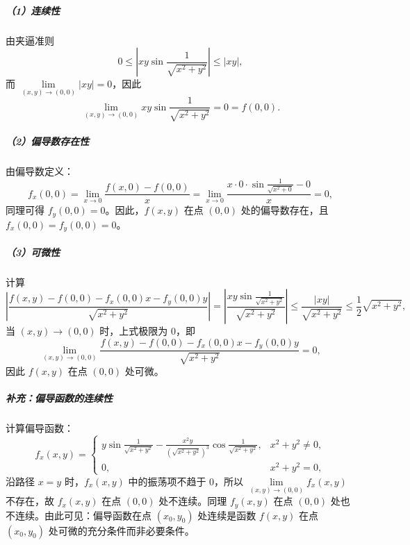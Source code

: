 \begin{solution}
    \subparagraph{（1）连续性}
由夹逼准则
\[
0 \le \left| xy\sin\frac{1}{\sqrt{x^2+y^2}} \right| \le |xy|,
\]
而 $\lim\limits_{(x,y)\to(0,0)} |xy| = 0$，因此
\[
\lim_{(x,y)\to(0,0)} xy\sin\frac{1}{\sqrt{x^2+y^2}} = 0=f(0,0).
\]

\subparagraph{（2）偏导数存在性}
由偏导数定义：
\[
f_x(0,0) = \lim_{x\to 0} \frac{f(x,0)-f(0,0)}{x}
= \lim_{x\to 0} \frac{x \cdot 0 \cdot \sin\frac{1}{\sqrt{x^2+0}} - 0}{x} = 0,
\]
同理可得 \( f_y(0,0) = 0 \)。因此，\( f(x,y) \) 在点 \( (0,0) \) 处的偏导数存在，且 \( f_x(0,0)=f_y(0,0)=0 \)。

\subparagraph{（3）可微性}
计算
\[
\left| \frac{f(x,y)-f(0,0)-f_x(0,0)x-f_y(0,0)y}{\sqrt{x^2+y^2}} \right|
= \left| \frac{xy\sin\frac{1}{\sqrt{x^2+y^2}}}{\sqrt{x^2+y^2}} \right|
\le \frac{|xy|}{\sqrt{x^2+y^2}}
\le \frac{1}{2}\sqrt{x^2+y^2},
\]
当 \( (x,y)\to(0,0) \) 时，上式极限为 0，即
\[
\lim_{(x,y)\to(0,0)} \frac{f(x,y)-f(0,0)-f_x(0,0)x-f_y(0,0)y}{\sqrt{x^2+y^2}} = 0,
\]
因此 \( f(x,y) \) 在点 \( (0,0) \) 处可微。

\subparagraph{补充：偏导函数的连续性}
计算偏导函数：
\[
f_x(x,y) =
\begin{cases}
y\sin\frac{1}{\sqrt{x^2+y^2}} - \frac{x^2y}{(\sqrt{x^2+y^2})^3}\cos\frac{1}{\sqrt{x^2+y^2}}, & x^2+y^2 \neq 0, \\
0, & x^2+y^2 = 0,
\end{cases}
\]
沿路径 $x=y$ 时，$f_x(x,y)$ 中的振荡项不趋于 $0$，所以 \( \lim\limits_{(x,y)\to(0,0)} f_x(x,y) \) 不存在，故 \( f_x(x,y) \) 在点 \( (0,0) \) 处不连续。同理 \( f_y(x,y) \) 在点 \( (0,0) \) 处也不连续。由此可见：偏导函数在点 \( (x_0,y_0) \) 处连续是函数 \( f(x,y) \) 在点 \( (x_0,y_0) \) 处可微的充分条件而非必要条件。
\end{solution}
